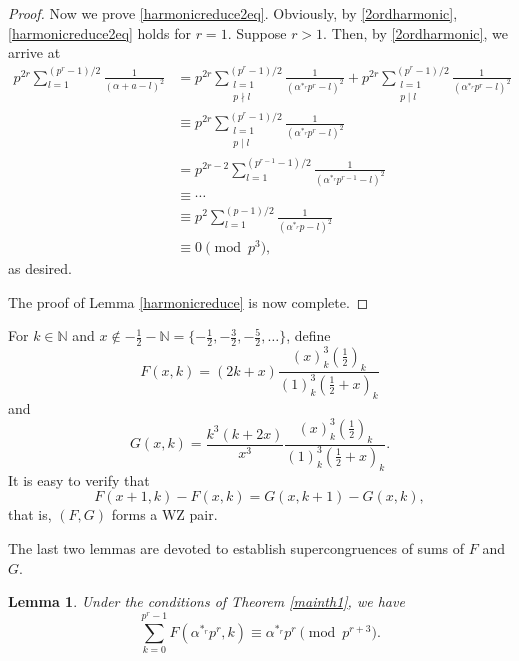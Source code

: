 \documentclass[12pt,reqno]{amsart}
\def\f{\frac}
\def\eq{\equiv}
\def\N{\mathbb N}
\def\p{\mathfrak p}
\theoremstyle{plain}
\newtheorem{lemma}{Lemma}[section]
\theoremstyle{definition}
\theoremstyle{remark}
\numberwithin{equation}{section}
\begin{document}
\begin{proof}
Now we prove \eqref{harmonicreduce2eq}. Obviously, by \eqref{2ordharmonic}, \eqref{harmonicreduce2eq} holds for $r=1$. Suppose $r>1$. Then, by \eqref{2ordharmonic}, we arrive at
\begin{align*}
p^{2r}\sum_{l=1}^{(p^r-1)/2}\f{1}{(\alpha+a-l)^2}&=p^{2r}\sum_{\substack{l=1\\p\nmid l}}^{(p^r-1)/2}\f{1}{(\alpha^{\ast_r}p^r-l)^2}+p^{2r}\sum_{\substack{l=1\\p\mid l}}^{(p^r-1)/2}\f{1}{(\alpha^{\ast_r}p^r-l)^2}\\
&\eq p^{2r}\sum_{\substack{l=1\\p\mid l}}^{(p^r-1)/2}\f{1}{(\alpha^{\ast_r}p^r-l)^2}\\
&= p^{2r-2}\sum_{l=1}^{(p^{r-1}-1)/2}\f{1}{(\alpha^{\ast_r}p^{r-1}-l)^2}\\
&\eq \cdots\\
&\eq p^2\sum_{l=1}^{(p-1)/2}\f{1}{(\alpha^{\ast_r}p-l)^2}\\
&\eq 0\pmod{p^3},
\end{align*}
as desired.

The proof of Lemma \ref{harmonicreduce} is now complete.
\end{proof}

For $k\in\N$ and $x\not\in-\f12-\N=\{-\f12,-\f32,-\f52,\ldots\}$, define
$$
F(x,k)=(2k+x)\f{(x)_k^3(\f12)_k}{(1)_k^3(\f12+x)_k}
$$
and
$$
G(x,k)=\f{k^3(k+2x)}{x^3}\f{(x)_k^3(\f12)_k}{(1)_k^3(\f12+x)_k}.
$$
It is easy to verify that
\begin{equation}\label{WZpair}
F(x+1,k)-F(x,k)=G(x,k+1)-G(x,k),
\end{equation}
that is, $(F,G)$ forms a WZ pair.

The last two lemmas are devoted to establish supercongruences of sums of $F$ and $G$.
\begin{lemma}\label{evalF}
Under the conditions of Theorem \ref{mainth1}, we have
$$
\sum_{k=0}^{p^r-1}F(\alpha^{\ast_r}p^r,k)\eq \alpha^{\ast_r}p^r\pmod{p^{r+3}}.
$$
\end{lemma}
\end{document}
